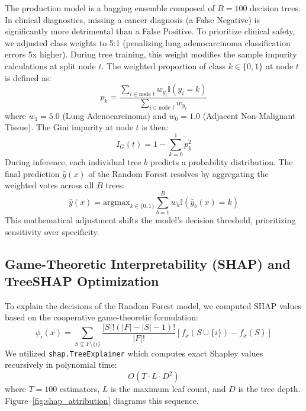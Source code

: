 \documentclass[journal,10pt]{IEEEtran}
\begin{document}
The production model is a bagging ensemble composed of $B = 100$ decision trees. In clinical diagnostics, missing a cancer diagnosis (a False Negative) is significantly more detrimental than a False Positive. To prioritize clinical safety, we adjusted class weights to 5:1 (penalizing lung adenocarcinoma classification errors 5x higher). During tree training, this weight modifies the sample impurity calculations at split node $t$. The weighted proportion of class $k \in \{0, 1\}$ at node $t$ is defined as:
\begin{equation}
p_k = \frac{\sum_{i \in \text{node } t} w_{y_i} \mathbb{I}(y_i = k)}{\sum_{i \in \text{node } t} w_{y_i}}
\end{equation}
where $w_1 = 5.0$ (Lung Adenocarcinoma) and $w_0 = 1.0$ (Adjacent Non-Malignant Tissue). The Gini impurity at node $t$ is then:
\begin{equation}
I_G(t) = 1 - \sum_{k=0}^1 p_k^2
\end{equation}
During inference, each individual tree $b$ predicts a probability distribution. The final prediction $\hat{y}(x)$ of the Random Forest resolves by aggregating the weighted votes across all $B$ trees:
\begin{equation}
\hat{y}(x) = \text{argmax}_{k \in \{0, 1\}} \sum_{b=1}^B w_k \mathbb{I}(\hat{y}_b(x) = k)
\end{equation}
This mathematical adjustment shifts the model's decision threshold, prioritizing sensitivity over specificity.

\subsection{Game-Theoretic Interpretability (SHAP) and TreeSHAP Optimization}
To explain the decisions of the Random Forest model, we computed SHAP values based on the cooperative game-theoretic formulation:
\begin{equation}
\phi_i(x) = \sum_{S \subseteq F \setminus \{i\}} \frac{|S|!(|F| - |S| - 1)!}{|F|!} [f_x(S \cup \{i\}) - f_x(S)]
\end{equation}
We utilized \texttt{shap.TreeExplainer} which computes exact Shapley values recursively in polynomial time:
\begin{equation}
O(T \cdot L \cdot D^2)
\end{equation}
where $T=100$ estimators, $L$ is the maximum leaf count, and $D$ is the tree depth. Figure~\ref{fig:shap_attribution} diagrams this sequence.
\end{document}
